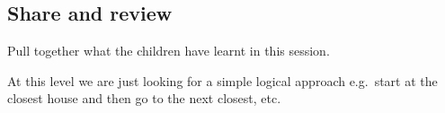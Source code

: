 \documentclass{../../../lessonplan}
\begin{document}
\begin{lessonplan}


\section*{Share and review} 

Pull together what the children have learnt in this session.



At this level we are just looking for a simple logical approach e.g.\ start at the closest house and then go to the next closest, etc.

\end{lessonplan}
\end{document}
